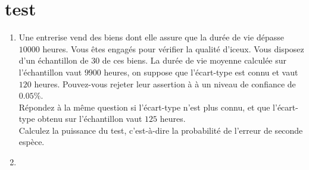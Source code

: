 \section{test}

\begin{enumerate}
\item Une entrerise vend des biens dont elle assure que la durée de vie dépasse $10000$ heures. Vous êtes engagés pour vérifier la qualité d'iceux. Vous disposez d'un échantillon de $30$ de ces biens. La durée de vie moyenne calculée sur l'échantillon vaut $9900$ heures, on suppose que l'écart-type est connu et vaut $120$ heures. Pouvez-vous rejeter leur assertion à à un niveau de confiance de $0.05\%$.\\
Répondez à la même question si l'écart-type n'est plus connu, et que l'écart-type obtenu sur l'échantillon vaut $125$ heures.\\
Calculez la puissance du test, c'est-à-dire la probabilité de l'erreur de seconde espèce.

\item 

\end{enumerate}



